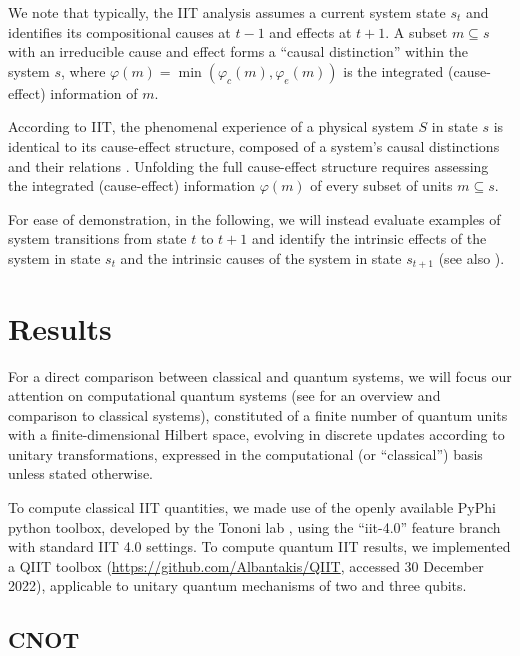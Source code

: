 \documentclass[preprints, article, accept, pdftex, moreauthors, letterpaper]{Definitions/mdpi}
\renewcommand{\=}[1]{\stackrel{#1}{=}} %
\renewcommand{\*}{\otimes}%
\begin{document}
We note that typically, the IIT analysis assumes a current system state $s_t$ and identifies its compositional causes at $t-1$ and effects at $t+1$. A subset $m \subseteq s$ with an irreducible cause and effect forms a ``causal distinction'' within the system $s$, where $\varphi(m) = \min(\varphi_c(m), \varphi_e(m))$ is the integrated (cause-effect) information of $m$. 

According to IIT, the phenomenal experience of a physical system $S$ in state $s$ is identical to its cause-effect structure, composed of a system's causal distinctions and their relations \cite{Haun2019}. 
Unfolding the full cause-effect structure requires assessing the integrated (cause-effect) information $\varphi(m)$ of every subset of units $m \subseteq s$.

For ease of demonstration, in the following, we will instead evaluate examples of system transitions from state $t$ to $t + 1$ and identify the intrinsic effects of the system in state $s_t$ and the intrinsic causes of the system in state $s_{t+1}$ (see also \cite{Albantakis2019}). 

\section{Results}

For a direct comparison between classical and quantum systems, we will focus our attention on computational quantum systems (see \cite{Mermin2007} for an overview and comparison to classical systems), constituted of a finite number of quantum units with a finite-dimensional Hilbert space, evolving in discrete updates according to unitary transformations, expressed in the computational (or “classical”) basis unless stated otherwise.

To compute classical IIT quantities, we made use of the openly available PyPhi python toolbox, developed by the Tononi lab \cite{Mayner2018, Gomez2021}, using the ``iit-4.0'' feature branch with standard IIT 4.0 settings. To compute quantum IIT results, we implemented a QIIT toolbox (\url{https://github.com/Albantakis/QIIT}, accessed 30 December 2022), applicable to unitary quantum mechanisms of two and three qubits.

\subsection{CNOT}
\end{document}
